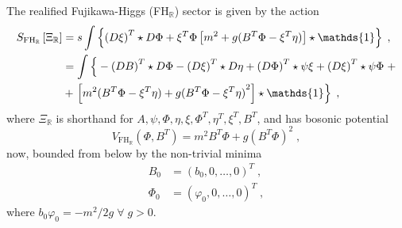 \documentclass[../main.tex]{subfiles}
\begin{document}
The realified Fujikawa-Higgs (FH$_{\mathbb{R}}$) sector is given by the action
\begin{subequations}%
  \label{eq:real-ffh-action}
  \begin{align}%
    S_{\text{FH}_{\mathbb{R}}} \left[ \Xi_{\mathbb{R}} \right] & = s \int \left\{ {(D \xi)}^{T} \star D \Phi + {\xi}^{T} \Phi \left[m^2 + g ( {B}^{T} \Phi - {\xi}^{T} \eta ) \right] \star \mathds{1} \right\} \;,                      \\
                                                               & = \int \left\{ \vphantom{m^2} -{(DB)}^{T} \star D \Phi - {(D \xi)}^{T} \star D \eta + {(D \Phi)}^{T} \star \psi \xi + {(D \xi)}^{T} \star \psi \Phi \right. + \nonumber \\
                                                               & + \left. \left[ m^2 ( {B}^{T} \Phi - {\xi}^{T} \eta ) + g {( {B}^{T} \Phi - {\xi}^{T} \eta )}^{2} \right] \star \mathds{1}  \right\} \;,
  \end{align}
\end{subequations}
where $\Xi_{\mathbb{R}}$ is shorthand for $A, \psi, \Phi, \eta, \xi, \Phi^T, \eta^T, \xi^T, B^T $, and has bosonic potential
\begin{equation}%
  \label{eq:real-ffh-potential}
  V_{\text{FH}_{\mathbb{R}}} ( \Phi, B^T) = m^2 B^{T} \Phi + g {( B^{T} \Phi )}^2 \;,
\end{equation}
now, bounded from below by the non-trivial minima
\begin{subequations}%
  \label{eq:real-ffh-minima}
  \begin{align}
  {B}_0       & = {(b_0, 0, \ldots, 0)}^{T}  \;,       \\
                   {\Phi}_0 & = {(\varphi_0, 0, \ldots, 0)}^{T}  \;,
  \end{align}
\end{subequations}
where $b_0 \varphi_0 = - m^2/2g \; \forall \; g>0$.
\end{document}
